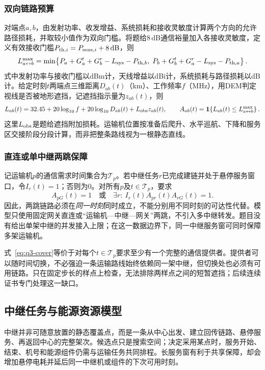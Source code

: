 \subsubsection{双向链路预算}
对端点$a,b$，由发射功率、收发增益、系统损耗和接收灵敏度计算两个方向的允许路径损耗，并取较小值作为双向门槛。将题给8\,dB通信裕量加入各接收灵敏度，定义有效接收门槛$P_{{\rm th},i}=P_{{\rm sens},i}+8\,\mathrm{dB}$，则
\begin{equation}
L^{\max}_{a\leftrightarrow b}
=\min\!\left\{
P_a+G_a^t+G_b^r-L_{\rm sys}-P_{{\rm th},b},\;
P_b+G_b^t+G_a^r-L_{\rm sys}-P_{{\rm th},a}
\right\}.
\label{eq:q3-budget}
\end{equation}
式中发射功率与接收门槛以dBm计，天线增益以dBi计，系统损耗与路径损耗以dB计。给定时刻$t$两端点三维距离$D_{ab}(t)$（km）、工作频率$f$（MHz），用DEM判定视线是否被地形遮挡，记遮挡指示量为$z_{ab}(t)$，则
\begin{equation}
L_{ab}(t)=32.45+20\log_{10}f+20\log_{10}D_{ab}(t)
+L_{\rm obs}z_{ab}(t),\qquad
A_{ab}(t)=\mathbf1\!\left\{L_{ab}(t)\le L^{\max}_{a\leftrightarrow b}\right\}.
\label{eq:q3-link}
\end{equation}
这里$L_{\rm obs}$是题给遮挡附加损耗。运输机位置按准备后爬升、水平巡航、下降和服务区交接阶段分段计算，而非把整条路线视为一根静态直线。

\subsubsection{直连或单中继两跳保障}
记运输机$p$的通信需求时间集合为$\mathcal T_p$。若中继任务$r$已完成建链并处于悬停服务窗口，令$I_r(t)=1$；否则为0。对所有$p$及$t\in\mathcal T_p$，要求
\begin{equation}
A_{pG}(t)=1
\quad\text{或}\quad
\exists r:\ I_r(t)A_{pr}(t)A_{rG}(t)=1.
\label{eq:q3-cover}
\end{equation}
因此，两跳链路必须在\emph{同一时刻}同时成立，不能分别用不同时刻的可达性代替。模型只使用固定网关直连或“运输机—中继—网关”两跳，不引入多中继转发。题目没有给出单架中继的并发接入上限；在这一数据边界下，同一中继服务窗可同时保障多架运输机。

式~\eqref{eq:q3-cover}等价于对每个$t\in\mathcal T_p$要求至少有一个完整的通信提供者。提供者可以随时间切换，不必强迫一条运输路线始终依赖同一架中继，但切换处也必须有可用链路。只在固定步长的样点上检查，无法排除两样点之间的短暂遮挡；后续连续证书专门处理这一缺口。

\subsection{中继任务与能源资源模型}
中继并非可随意放置的静态覆盖点，而是一条从中心出发、建立回传链路、悬停服务、再返回中心的完整架次。候选点只是搜索空间；决定采用某点时，服务开始、结束、机号和能源组件仍需与运输任务共同排程。长服务窗有利于共享保障，却会增加悬停电耗并延后同一中继机或组件的下次可用时刻。
